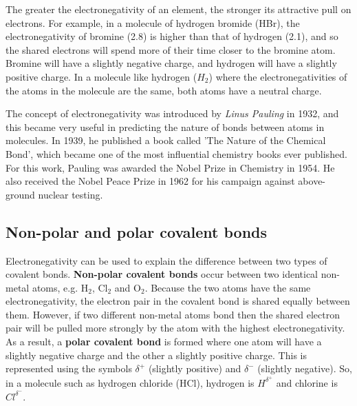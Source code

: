 
The greater the electronegativity of an element, the stronger its attractive pull on electrons. For example, in a molecule of hydrogen bromide (HBr), the electronegativity of bromine (2.8) is higher than that of hydrogen (2.1), and so the shared electrons will spend more of their time closer to the bromine atom. Bromine will have a slightly negative charge, and hydrogen will have a slightly positive charge. In a molecule like hydrogen ($H_{2}$) where the electronegativities of the atoms in the molecule are the same, both atoms have a neutral charge. \\

\begin{IFact}{
The concept of electronegativity was introduced by \textit{Linus Pauling} in 1932, and this became very useful in predicting the nature of bonds between atoms in molecules. In 1939, he published a book called 'The Nature of the Chemical Bond', which became one of the most influential chemistry books ever published. For this work, Pauling was awarded the Nobel Prize in Chemistry in 1954. He also received the Nobel Peace Prize in 1962 for his campaign against above-ground nuclear testing.
}
\end{IFact}

\subsection{Non-polar and polar covalent bonds}

Electronegativity can be used to explain the difference between two
types of covalent bonds. \textbf{Non-polar covalent bonds} occur between two
identical non-metal atoms, e.g. H$_2$, Cl$_2$ and O$_2$. Because the two atoms
have the same electronegativity, the electron pair in the covalent
bond is shared equally between them. However, if two different
non-metal atoms bond then the shared electron pair will be pulled more
strongly by the atom with the highest electronegativity. As a result, a \textbf{polar covalent bond} is formed where one atom will have a slightly negative charge and the other a slightly
positive charge. This is represented using the symbols $\delta^{+}$ (slightly positive) and $\delta^{-}$ (slightly negative). So, in a molecule such as hydrogen chloride (HCl), hydrogen is $H^{\delta^{+}}$ and chlorine is $Cl^{\delta^{-}}$.

